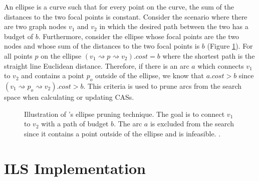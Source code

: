 \documentclass[11pt]{article}
\newcommand{\spa}{\rightsquigarrow}
\begin{document}
An ellipse is a curve such that for every point on the curve, the sum of the distances to the two focal points is constant. Consider the scenario where there are two graph nodes $v_1$ and $v_2$ in which the desired path between the two has a budget of $b$. Furthermore, consider the ellipse whose focal points are the two nodes and whose sum of the distances to the two focal points is $b$ (Figure \ref{fig:ellipse}). For all points $p$ on the ellipse $(v_1 \spa p \spa v_2).cost = b$ where the shortest path is the straight line Euclidean distance. Therefore, if there is an arc $a$ which connects $v_1$ to $v_2$ and contains a point $p_o$ outside of the ellipse, we know that $a.cost > b$ since $(v_1 \spa p_o \spa v_2).cost > b$. This criteria is used to prune arcs from the search space when calculating or updating CASs.

\begin{figure}[!h]
\begin{center}
\end{center}
\caption{Illustration of \citeauthor{lu2015arc}'s ellipse pruning technique. The goal is to connect $v_1$ to $v_2$ with a path of budget $b$. The arc $a$ is excluded from the search since it contains a point outside of the ellipse and is infeasible. \cite{lu2015arc}.}
\label{fig:ellipse}
\end{figure}



\section{ILS Implementation}
\end{document}
